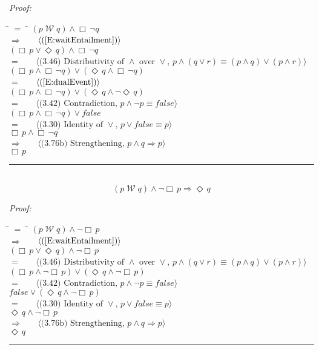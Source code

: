\documentclass[fleqn, leqno]{article}
\newcommand{\lgap}{2pt}                             %
\newcommand{\mymathindent}{24pt}                    %
\newcommand{\impl}{\ensuremath{\Rightarrow}}        %
\newcommand{\Wait}{\;\mathcal{W}\;}
\newcommand{\Event}{\Diamond\,}
\newcommand{\Always}{\Box\,}
\newcommand{\myqed}{\hfill\rule[-.23ex]{1.2ex}{2.0ex}}
\newcommand{\Gll} {\langle}                         %
\newcommand{\Ggg} {\rangle}                         %
\newcommand{\Hint}[1]     {\ \ \ $\Gll              \mbox{#1} \Ggg$ }   %
\begin{document}
\emph{Proof:}
\begin{tabbing}
\hspace{\mymathindent} \= $= \;$ \= \kill
\> \> $(p \Wait q) \land \Always\neg q$\\[\lgap]
\> $\impl$ \> \Hint{(\ref{E:waitEntailment})} \\[\lgap]
\> \> $(\Always p \lor \Event q) \land \Always\neg q$\\[\lgap]
\> $=$ \> \Hint{(3.46) Distributivity of $\land$ over $\lor$, $p\land (q\lor r)\equiv (p\land q)\lor (p\land r)$} \\[\lgap]
\> \> $(\Always p \land \Always\neg q) \lor (\Event q \land \Always\neg q)$\\[\lgap]
\> $=$ \> \Hint{(\ref{E:dualEvent})} \\[\lgap]
\> \> $(\Always p \land \Always\neg q) \lor (\Event q \land \neg\Event q)$\\[\lgap]
\> $=$ \> \Hint{(3.42) Contradiction, $p \land \neg p \equiv false$} \\[\lgap]
\> \> $(\Always p \land \Always\neg q) \lor false$\\[\lgap]
\> $=$ \> \Hint{(3.30) Identity of $\lor$, $p\lor false\equiv p$} \\[\lgap]
\> \> $\Always p \land \Always\neg q$\\[\lgap]
\> $\impl$ \> \Hint{(3.76b) Strengthening, $p\land q \impl p$} \\[\lgap]
\> \> $\Always p$\\[\lgap]
\end{tabbing}
\myqed\\[\lgap]


\begin{equation}\label{E:waitEntailEvent}
(p \Wait q) \land \neg\Always p \impl \Event q
\end{equation}

\emph{Proof:}
\begin{tabbing}
\hspace{\mymathindent} \= $= \;$ \= \kill
\> \> $(p \Wait q) \land \neg\Always p$\\[\lgap]
\> $\impl$ \> \Hint{(\ref{E:waitEntailment})} \\[\lgap]
\> \> $(\Always p \lor \Event q) \land \neg\Always p$\\[\lgap]
\> $=$ \> \Hint{(3.46) Distributivity of $\land$ over $\lor$, $p\land (q\lor r)\equiv (p\land q)\lor (p\land r)$} \\[\lgap]
\> \> $(\Always p \land \neg\Always p) \lor (\Event q \land \neg\Always p)$\\[\lgap]
\> $=$ \> \Hint{(3.42) Contradiction, $p \land \neg p \equiv false$} \\[\lgap]
\> \> $false \lor (\Event q \land \neg\Always p)$\\[\lgap]
\> $=$ \> \Hint{(3.30) Identity of $\lor$, $p\lor false\equiv p$} \\[\lgap]
\> \> $\Event q \land \neg\Always p$\\[\lgap]
\> $\impl$ \> \Hint{(3.76b) Strengthening, $p\land q \impl p$} \\[\lgap]
\> \> $\Event q$\\[\lgap]
\end{tabbing}
\myqed\\[\lgap]
\end{document}
